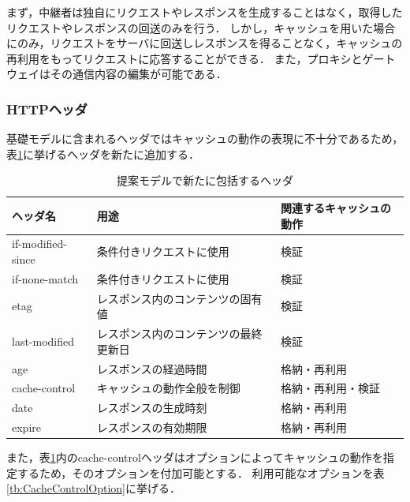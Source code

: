 \documentclass[12pt,a4paper]{jbook}
\begin{document}
まず，中継者は独自にリクエストやレスポンスを生成することはなく，取得したリクエストやレスポンスの回送のみを行う．
しかし，キャッシュを用いた場合にのみ，リクエストをサーバに回送しレスポンスを得ることなく，キャッシュの再利用をもってリクエストに応答することができる．
また，プロキシとゲートウェイはその通信内容の編集が可能である．

\subsubsection{HTTPヘッダ}
基礎モデルに含まれるヘッダではキャッシュの動作の表現に不十分であるため，表\ref{tb:ProposedModel-Headers}に挙げるヘッダを新たに追加する．

\begin{table}[htb]
\centering
\caption{提案モデルで新たに包括するヘッダ}
\label{tb:ProposedModel-Headers}
\begin{tabular}{lll}
\hline
ヘッダ名 & 用途 & 関連するキャッシュの動作 \\
\hline
if-modified-since & 条件付きリクエストに使用 & 検証 \\
if-none-match & 条件付きリクエストに使用 & 検証 \\
etag & レスポンス内のコンテンツの固有値 & 検証 \\
last-modified & レスポンス内のコンテンツの最終更新日 & 検証 \\
age & レスポンスの経過時間 & 格納・再利用 \\
cache-control & キャッシュの動作全般を制御 & 格納・再利用・検証 \\
date & レスポンスの生成時刻 & 格納・再利用 \\
expire & レスポンスの有効期限 & 格納・再利用 \\
\hline
\end{tabular}
\end{table}

また，表\ref{tb:ProposedModel-Headers}内のcache-controlヘッダはオプションによってキャッシュの動作を指定するため，そのオプションを付加可能とする．
利用可能なオプションを表\ref{tb:CacheControlOption}に挙げる．
\end{document}
